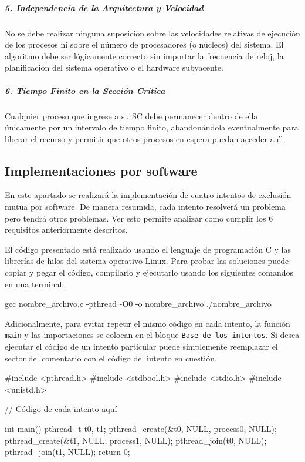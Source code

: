\subparagraph{5. Independencia de la Arquitectura y Velocidad}
No se debe realizar ninguna suposición sobre las velocidades relativas de ejecución de los procesos ni sobre el número de procesadores (o núcleos) del sistema. El algoritmo debe ser lógicamente correcto sin importar la frecuencia de reloj, la planificación del sistema operativo o el hardware subyacente.

\subparagraph{6. Tiempo Finito en la Sección Crítica}
Cualquier proceso que ingrese a su SC debe permanecer dentro de ella únicamente por un intervalo de tiempo finito, abandonándola eventualmente para liberar el recurso y permitir que otros procesos en espera puedan acceder a él.

\subsection{Implementaciones por software}

En este apartado se realizará la implementación de cuatro intentos de exclusión mutua por software. De manera resumida, cada intento resolverá un problema pero tendrá otros problemas. Ver esto permite analizar como cumplir los 6 requisitos anteriormente descritos.

El código presentado está realizado usando el lenguaje de programación C y las librerías de hilos del sistema operativo Linux. Para probar las soluciones puede copiar y pegar el código, compilarlo y ejecutarlo usando los siguientes comandos en una terminal.
\begin{bashcode}[title=Compilar y ejecutar ejemplos]
gcc nombre_archivo.c -pthread -O0 -o nombre_archivo 
./nombre_archivo
\end{bashcode}

Adicionalmente, para evitar repetir el mismo código en cada intento, la función \texttt{main} y las importaciones se colocan en el bloque \texttt{Base de los intentos}. Si desea ejecutar el código de un intento particular puede simplemente reemplazar el sector del comentario con el código del intento en cuestión.

\begin{ccode}[title=Base de los intentos]
#include <pthread.h>
#include <stdbool.h>
#include <stdio.h>
#include <unistd.h>

// Código de cada intento aquí

int main() {
  pthread_t t0, t1;
  pthread_create(&t0, NULL, process0, NULL);
  pthread_create(&t1, NULL, process1, NULL);
  pthread_join(t0, NULL);
  pthread_join(t1, NULL);
  return 0;
}
\end{ccode}


